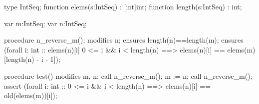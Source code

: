 type IntSeq;
function elems(s:IntSeq) : [int]int;
function length(s:IntSeq) : int;

var m:IntSeq;
var n:IntSeq;

procedure n_reverse_m();
    modifies n;
    ensures length(n)==length(m);
    ensures (forall i: int ::  {elems(n)[i]}
        0 <= i && i < length(n) ==>
            elems(n)[i] == elems(m)[length(n) - i - 1]);
      
procedure test()
    modifies m, n;
{
    call n_reverse_m();
    m := n; call n_reverse_m();
    assert (forall i: int ::
        0 <= i && i < length(n) ==> 
            elems(n)[i] == old(elems(m))[i]);
}
  
  